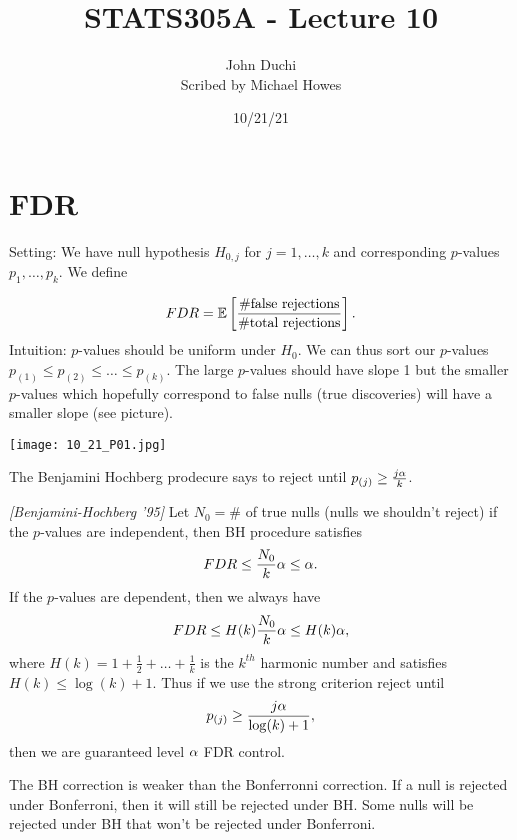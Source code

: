 




\title{STATS305A - Lecture 10}
\author{John Duchi\\ Scribed by Michael Howes}
\date{10/21/21}

\pagestyle{fancy}
\fancyhf{}


\maketitle
\tableofcontents
\section{FDR}
Setting: We have null hypothesis $H_{0,j}$ for $j=1,\ldots,k$ and corresponding $p$-values $p_1,\ldots, p_k$. We define

\[FDR = {\mathbb{E}}\left[\frac{\#\text{false rejections}}{\#\text{total rejections}}\right]. \]
Intuition: $p$-values should be uniform under $H_0$. We can thus sort our $p$-values $p_{(1)} \le p_{(2)} \le \ldots \le p_{(k)}$. The large $p$-values should have slope 1 but the smaller $p$-values which hopefully correspond to false nulls (true discoveries) will have a smaller slope (see picture).

\begin{center}
\texttt{[image: 10\_21\_P01.jpg]}
\end{center}

The Benjamini Hochberg prodecure says to reject until $p_{(j)} \ge \frac{j{\alpha}}{k}$.
\begin{thrm}
    \emph{[Benjamini-Hochberg '95]} Let $N_0 = \#$ of true nulls (nulls we shouldn't reject) if the $p$-values are independent, then BH procedure satisfies 
    \[FDR \le \frac{N_0}{k} {\alpha} \le {\alpha}. \]
    If the $p$-values are dependent, then we always have
    \[FDR \le H(k) \frac{N_0}{k} {\alpha} \le H(k){\alpha}, \]
    where $H(k) = 1+\frac{1}{2}+\ldots + \frac{1}{k}$ is the $k^{th}$ harmonic number and satisfies $H(k) \le \log(k)+1$. Thus if we use the strong criterion reject until 
    \[p_{(j)} \ge \frac{j{\alpha}}{\log(k)+1}, \]
    then we are guaranteed level ${\alpha}$ FDR control.
\end{thrm}
The BH correction is weaker than the Bonferronni correction. If a null is rejected under Bonferroni, then it will still be rejected under BH. Some nulls will be rejected under BH that won't be rejected under Bonferroni.

